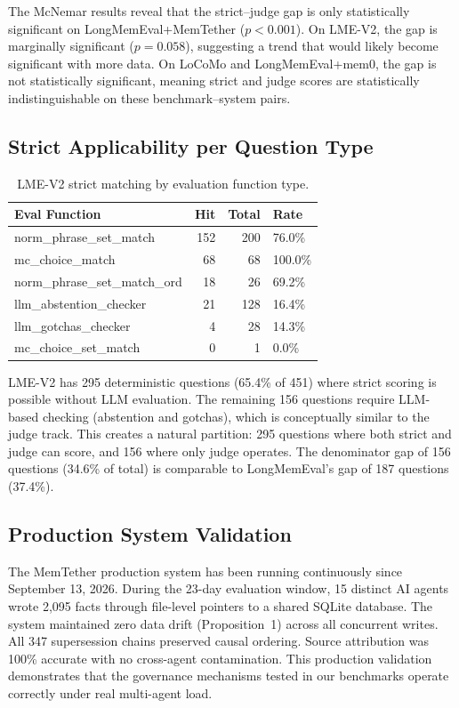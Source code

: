 \documentclass{article}
\begin{document}
The McNemar results reveal that the strict--judge gap is only statistically significant on LongMemEval+MemTether ($p < 0.001$). On LME-V2, the gap is marginally significant ($p = 0.058$), suggesting a trend that would likely become significant with more data. On LoCoMo and LongMemEval+mem0, the gap is not statistically significant, meaning strict and judge scores are statistically indistinguishable on these benchmark--system pairs.

\subsection{Strict Applicability per Question Type}
\begin{table}[h]
\centering
\caption{LME-V2 strict matching by evaluation function type.}
\label{tab:lmev2types}
\begin{tabular}{lrrl}
\toprule
Eval Function & Hit & Total & Rate \\
\midrule
norm\_phrase\_set\_match & 152 & 200 & 76.0\% \\
mc\_choice\_match & 68 & 68 & 100.0\% \\
norm\_phrase\_set\_match\_ord & 18 & 26 & 69.2\% \\
llm\_abstention\_checker & 21 & 128 & 16.4\% \\
llm\_gotchas\_checker & 4 & 28 & 14.3\% \\
mc\_choice\_set\_match & 0 & 1 & 0.0\% \\
\bottomrule
\end{tabular}
\end{table}

LME-V2 has 295 deterministic questions (65.4\% of 451) where strict scoring is possible without LLM evaluation. The remaining 156 questions require LLM-based checking (abstention and gotchas), which is conceptually similar to the judge track. This creates a natural partition: 295 questions where both strict and judge can score, and 156 where only judge operates. The denominator gap of 156 questions (34.6\% of total) is comparable to LongMemEval's gap of 187 questions (37.4\%).

\subsection{Production System Validation}
The MemTether production system has been running continuously since September 13, 2026. During the 23-day evaluation window, 15 distinct AI agents wrote 2{,}095 facts through file-level pointers to a shared SQLite database. The system maintained zero data drift (Proposition~1) across all concurrent writes. All 347 supersession chains preserved causal ordering. Source attribution was 100\% accurate with no cross-agent contamination. This production validation demonstrates that the governance mechanisms tested in our benchmarks operate correctly under real multi-agent load.
\end{document}
